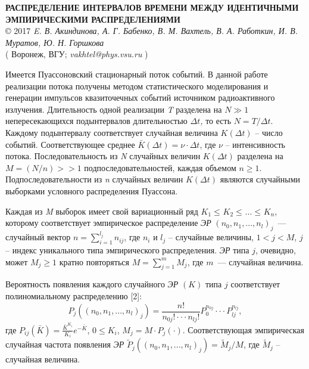 \begin{center}{ \bf  РАСПРЕДЕЛЕНИЕ ИНТЕРВАЛОВ ВРЕМЕНИ МЕЖДУ ИДЕНТИЧНЫМИ ЭМПИРИЧЕСКИМИ РАСПРЕДЕЛЕНИЯМИ}\\
{\copyright} 2017 {\it  E. В. Акиндинова, А. Г. Бабенко, В. М. Вахтель,
В. А. Работкин,  И. В. Муратов, Ю. Н. Горшкова} \\
( Воронеж, ВГУ; {\it vakhtel@phys.vsu.ru} )
\end{center}

Имеется Пуассоновский стационарный поток событий.
В данной работе реализации потока получены методом статистического моделирования и генерации импульсов квазиточечных событий
источником радиоактивного излучения.
Длительность одной реализации \textit{T} разделена на $N \gg 1$ непересекающихся подынтервалов длительностью $\Delta t$\textit{,} то есть $N=T/\Delta t$. Каждому подынтервалу соответствует случайная величина $K(\Delta t)$ -- число событий.  Соответствующее среднее $\bar{K}(\Delta t)=\nu \cdot \Delta t$, где $\nu $ -- интенсивность потока. Последовательность из \textit{N} случайных величин $K(\Delta t)$ разделена на $M=(N/n)>>1$  подпоследовательностей, каждая объемом $n\geqslant 1$. Подпоследовательности из \textit{n}  случайных величин $K(\Delta t)$ являются случайными выборками условного распределения Пуассона.


Каждая из \textit{M} выборок имеет свой вариационный ряд $K_{1}  \leqslant _{} K_{2}  \leqslant _{}  ...  \leqslant _{} K{}_{n} $,
которому соответствует эмпирическое распределение {\it ЭР} $ ( n_{0} ,    n_{1} ,  ...  ,   n_{l}  )_{j} $~---
случайный вектор $n=\sum _{i=1}^{l_{j} }n_{ij}  $, где $n_{i} $ и $l_{j} $ --  случайные величины,
$1<j<M$, $j$ -- индекс уникального типа эмпирического распределения.
{\it ЭР}  типа  $j$, очевидно, может $M_{j} \geqslant 1$ кратно повторяться $M=\sum _{j=1}^{m}M_{j}  $, где $m$~--- случайная величина.


Вероятность появления каждого случайного {\it ЭР} $ (K)$ типа $j$ соответствует полиномиальному распределению [2]:
\[P_{j} (( n_{0} ,  n_{1} ,  ...  ,  n_{l}  )_{j} )=\frac{n!}{n_{0j} !\cdot \cdot \cdot n_{lj} !} P_{0}^{n_{0j} } \cdot \cdot \cdot P_{lj}^{n_{lj} } ,\]
где $P_{ij} (\bar{K})=\frac{\bar{K}^{K_{i} } }{K_{i} } e^{-\bar{K}} $, $0\leqslant K_{i} $, $M_{j} =M\cdot P_{j} (\cdot)$. Соответствующая эмпирическая случайная частота появления {\it ЭР}    $\tilde{P}_{j} (( n_{0} ,  n_{1} ,  ...  ,  n_{l}  )_{j} )=\tilde{M}_{j} /M$, где $\tilde{M}_{j} $ --  случайная величина.


